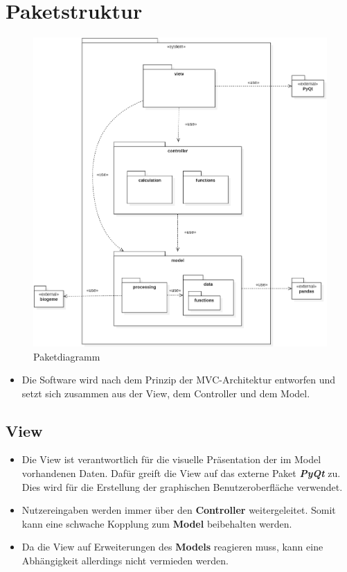 \documentclass{article}
\begin{document}
\section{Paketstruktur}
\begin{figure}[H]%
    \centering
    \includegraphics[width=13cm]{img/PackageDiagram.png}
    \caption{Paketdiagramm}
\end{figure}

\begin{itemize}
\item Die Software wird nach dem Prinzip der MVC-Architektur entworfen und setzt sich zusammen aus der View, dem Controller und dem Model.
\end{itemize}

\subsection{View}
\begin{itemize}
\item Die View ist verantwortlich für die visuelle Präsentation der im Model vorhandenen Daten. Dafür greift die View auf das externe Paket \textit{\textbf{PyQt}} zu. Dies wird für die Erstellung der graphischen Benutzeroberfläche verwendet.
\item Nutzereingaben werden immer über den \textbf{Controller} weitergeleitet. Somit kann eine schwache Kopplung zum \textbf{Model} beibehalten werden.
\item Da die View auf Erweiterungen des \textbf{Models} reagieren muss, kann eine Abhängigkeit allerdings nicht vermieden werden.
\end{itemize}
\end{document}
